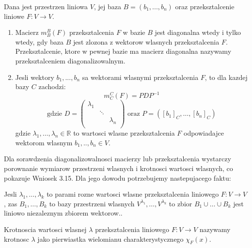 \documentclass{article}
\begin{document}
\begin{tcolorbox}[colback=white!90!blue,colframe=black!35!blue,title=Twierdzenie 3.11 Twierdzenie o diagonalizacji przeksztalcenia]

Dana jest przestrzen liniowa $V$, jej baza $B = (b_{1},...,b_{n})$ oraz przeksztalcenie liniowe $F: V \rightarrow V$.
\begin{enumerate}
\item Macierz $m^{B}_{B}(F)$ przeksztalcenia $F$ w bazie $B$ jest diagonalna wtedy i tylko wtedy, gdy baza $B$ jest zlozona z wektorow wlasnych przeksztalcenia $F$. Przeksztalcenie, ktore w pewnej bazie ma macierz diagonalna nazywamy przeksztalceniem diagonalizowalnym.
\item Jesli wektory $b_{1},...,b_{n}$ sa wektorami wlasnymi przeksztalcenia $F$, to dla kazdej bazy $C$ zachodzi:
$$m_{C}^{C}(F) = PDP^{-1}$$  $$ \text{gdzie } D = \begin{pmatrix}
{\lambda}_{1} & & \\
& \ddots & \\
& & {\lambda}_{n} \\    
\end{pmatrix} \text{ oraz } P = ([b_{1}]_{C},\dots, [b_{n}]_{C}) 
$$
gdzie ${\lambda}_{1},\dots,{\lambda}_{n} \in \mathbb{R}$ to wartosci wlasne przeksztalcenia $F$ odpowiadajce wektorom wlasnym $b_{1},..,b_{n} \in V.$

\end{enumerate}


\end{tcolorbox}

Dla sorawdzenia diagonalizowalnosci macierzy lub przeksztalcenia wystarczy porownanie wymiarow przestrzeni wlasnych i krotnosci wartosci wlasnych, co pokazuje Wniosek 3.15. Dla jego dowodu potrzebujemy nastepujacego faktu:

\begin{tcolorbox}[colback=white!90!green,colframe=black!35!green,title=Fakt 3.12: Liniowo niezalezne wektory wlasne v2]

Jesli ${\lambda}_{1},\dots,{\lambda}_{k}$ to parami rozne wartosci wlasne przeksztalcenia liniowego $F:V \rightarrow V$, zas $B_{1},\dots,B_{k}$ to bazy przestrzeni wlasnych $V^{{\lambda}_{1}},\dots,V^{{\lambda}_{k}}$ to zbior $B_{1} \cup \dots \cup B_{k}$ jest liniowo niezaleznym zbiorem wektorow..
\end{tcolorbox} 
\begin{tcolorbox}[colback=white!90!red,colframe=black!35!red,title=Definicja 3.13 Krotnosc wartosci wlasnej]
Krotnoscia wartosci wlasnej $\lambda$ przeksztalcenia liniowego $F: V \rightarrow V$ nazywamy krotnosc $\lambda$ jako pierwiastka wielomianu charakterystycznego ${\chi}_{F}(x)$.

\end{tcolorbox}
\end{document}
